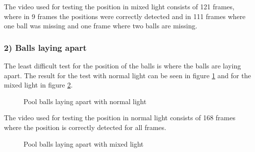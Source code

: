 The video used for testing the position in mixed light consists of 121 frames, where in 9 frames the positions were correctly detected and in 111 frames where one ball was missing and one frame where two balls are missing.

\subsubsection{ 2) Balls laying apart}
The least difficult test for the position of the balls is where the balls are laying apart. The result for the test with normal light can be seen in figure \ref{fig:apartnormal} and for the mixed light in figure \ref{fig:apartmixed}.

\begin{figure}[H]
  \centering
\quad
\quad
   \caption{Pool balls laying apart with normal light}
  \label{fig:apartnormal}
\end{figure}

The video used for testing the position in normal light consists of 168 frames where the position is correctly detected for all frames.

\begin{figure}[H]
  \centering
\quad
\quad
   \caption{Pool balls laying apart with mixed light}
  \label{fig:apartmixed}
\end{figure}

